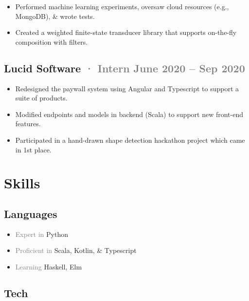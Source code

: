 \documentclass[12pt]{article} %
\providecommand{\tightlist}{%
  \setlength{\itemsep}{0pt}\setlength{\parskip}{0pt}}
\renewcommand{\emph}[1]{%
  \textcolor{gray}{#1}%
}
\begin{document}
\begin{paracol}{2}
\begin{raggedright}
\begin{itemize}
\tightlist
\item
  Performed machine learning experiments, oversaw cloud resources (e.g.,
  MongoDB), \& wrote tests.
\item
  Created a weighted finite-state transducer library that supports
  on-the-fly composition with filters.
\end{itemize}

\hypertarget{lucid-software-intern-june-2020-sep-2020}{%
\subsection{\texorpdfstring{Lucid Software \emph{· \small Intern
\hfill June 2020 -- Sep
2020}}{Lucid Software · Intern June 2020 -- Sep 2020}}\label{lucid-software-intern-june-2020-sep-2020}}

\begin{itemize}
\tightlist
\item
  Redesigned the paywall system using Angular and Typescript to support
  a suite of products.
\item
  Modified endpoints and models in backend (Scala) to support new
  front-end features.
\item
  Participated in a hand-drawn shape detection hackathon project which
  came in 1st place.
\end{itemize}

\switchcolumn 

\hypertarget{skills}{%
\section{Skills}\label{skills}}

\hypertarget{languages}{%
\subsection{Languages}\label{languages}}

\begin{itemize}
\tightlist
\item
  \emph{Expert in} Python
\item
  \emph{Proficient in} Scala, Kotlin, \& Typescript
\item
  \emph{Learning} Haskell, Elm
\end{itemize}

\hypertarget{tech}{%
\subsection{Tech}\label{tech}}


\end{raggedright}
\end{paracol}
\end{document}
